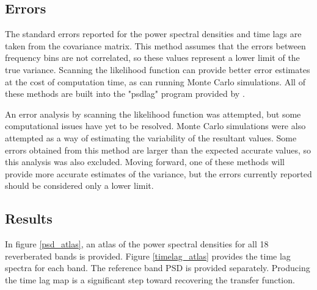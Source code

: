 \documentclass[11pt,letterpaper]{article}
\begin{document}
    \subsection{Errors}
	The standard errors reported for the power spectral densities and time lags are taken from the covariance matrix. This method assumes that the errors between frequency bins are not correlated, so these values represent a lower limit of the true variance. Scanning the likelihood function can provide better error estimates at the cost of computation time, as can running Monte Carlo simulations. All of these methods are built into the "psdlag" program provided by \cite{2013ApJ...777...24Z}.

    An error analysis by scanning the likelihood function was attempted, but some computational issues have yet to be resolved. Monte Carlo simulations were also attempted as a way of estimating the variability of the resultant values. Some errors obtained from this method are larger than the expected accurate values, so this analysis was also excluded. Moving forward, one of these methods will provide more accurate estimates of the variance, but the errors currently reported should be considered only a lower limit.

    \subsection{Results}
    \label{results}

    In figure \ref{psd_atlas}, an atlas of the power spectral densities for all 18 reverberated bands is provided. Figure \ref{timelag_atlas} provides the time lag spectra for each band. The reference band PSD is provided separately. Producing the time lag map is a significant step toward recovering the transfer function.
\end{document}
